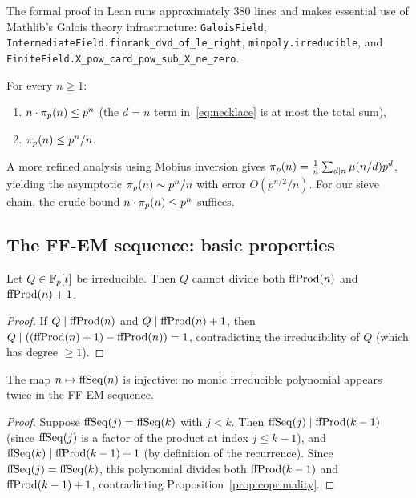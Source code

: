 The formal proof in Lean runs approximately 380 lines and makes essential
use of Mathlib's Galois theory infrastructure:
\texttt{GaloisField}, \texttt{IntermediateField.finrank\_dvd\_of\_le\_right},
\texttt{minpoly.irreducible}, and \texttt{FiniteField.X\_pow\_card\_pow\_sub\_X\_ne\_zero}.

\begin{corollary}\label{cor:irred-bounds}
For every $n \geq 1$:
\begin{enumerate}[label=(\roman*)]
  \item $n \cdot \pi_p(n) \leq p^n$ (the $d = n$ term in~\eqref{eq:necklace}
    is at most the total sum),
  \item $\pi_p(n) \leq p^n / n$.
\end{enumerate}
\end{corollary}

A more refined analysis using Mobius inversion gives
$\pi_p(n) = \frac{1}{n}\sum_{d \mid n} \mu(n/d) p^d$, yielding the
asymptotic $\pi_p(n) \sim p^n/n$ with error $O(p^{n/2}/n)$. For
our sieve chain, the crude bound $n \cdot \pi_p(n) \leq p^n$ suffices.

\subsection{The FF-EM sequence: basic properties}

\begin{proposition}\label{prop:coprimality}
Let $Q \in \mathbb{F}_p[t]$ be irreducible. Then $Q$ cannot divide both $\mathrm{ffProd}(n)$
and $\mathrm{ffProd}(n) + 1$.
\end{proposition}

\begin{proof}
If $Q \mid \mathrm{ffProd}(n)$ and $Q \mid \mathrm{ffProd}(n) + 1$, then
$Q \mid ((\mathrm{ffProd}(n)+1) - \mathrm{ffProd}(n)) = 1$, contradicting the
irreducibility of $Q$ (which has degree $\geq 1$).
\end{proof}

\begin{proposition}[Injectivity]\label{prop:injectivity}
The map $n \mapsto \mathrm{ffSeq}(n)$ is injective: no monic irreducible
polynomial appears twice in the FF-EM sequence.
\end{proposition}

\begin{proof}
Suppose $\mathrm{ffSeq}(j) = \mathrm{ffSeq}(k)$ with $j < k$. Then $\mathrm{ffSeq}(j) \mid
\mathrm{ffProd}(k-1)$ (since $\mathrm{ffSeq}(j)$ is a factor of the product at index $j
\leq k-1$), and $\mathrm{ffSeq}(k) \mid \mathrm{ffProd}(k-1) + 1$ (by definition of the
recurrence). Since $\mathrm{ffSeq}(j) = \mathrm{ffSeq}(k)$, this polynomial divides both
$\mathrm{ffProd}(k-1)$ and $\mathrm{ffProd}(k-1)+1$, contradicting
Proposition~\ref{prop:coprimality}.
\end{proof}

